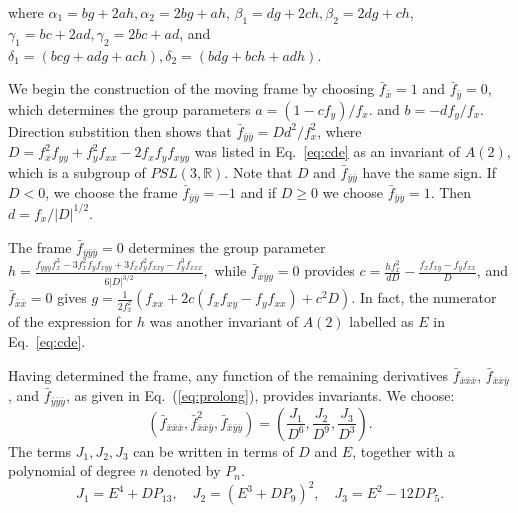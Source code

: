 \documentclass{artjlt}
\def\R{\mathbb{R}}
\begin{document}
\noindent where $\alpha_1 = b g + 2 a h, \alpha_2 = 2 b g + a h$, $\beta_1 = d g + 2 c h, \beta_2 = 2 d g + c h$, $\gamma_1 = b c + 2 a d, \gamma_2= 2 b c + a d$, and $\delta_1 = (b c g+a d g+a c h), \delta_2 = (b d g+b c h+a d h)$.

We begin the construction of the moving frame by choosing $\bar f_{\bar x}
= 1$ and $\bar f_{\bar y}=  0$, which determines the group parameters $a =
(1-c f_y)/f_x.$ and $b = -d f_y/f_x$. Direction substition then shows that
$\bar f_{\bar y \bar y} = D d^2 / f_x^2$, where $D = f_{x}^2 f_{yy} + f_y^2
f_{xx} - 2 f_x f_y f_{xyy}$ was listed in Eq.~\eqref{eq:cde} as an invariant of
$A(2)$, which is a subgroup of $PSL(3,\R)$. Note that $D$ and
$\bar f_{\bar y \bar y}$ have the same sign. If $D < 0$, we choose the
frame $\bar{f}_{\bar y \bar y} = -1$ and if $D \ge 0$ we choose $\bar
f_{\bar y \bar y} = 1$. Then $d = f_x/|D|^{1/2}.$

The frame $\bar f_{ \bar y \bar y \bar y} = 0$ determines the group
parameter $ h = \frac{f_{yyy}f_x^3 - 3 f_x^2 f_y f_{xyy} + 3 f_x f_y^2
f_{xxy} - f_y^3 f_{xxx}}{6|D|^{3/2}},$ while $\bar f_{ \bar x \bar y 
y}=0$ provides $ c = \frac{h f_x^2}{d D} - \frac{f_x f_{xy} - f_y
f_{xx}}{D}$, and $\bar f_{ \bar x \bar x}=0$ gives $ g = \frac{1}{2
f_x^2}(f_{xx} + 2 c ( f_x f_{xy} - f_y f_{xx} ) + c^2 D).$ In fact, the
numerator of the expression for $h$ was another invariant of $A(2)$ labelled as
$E$ in Eq.~\eqref{eq:cde}.


Having determined the frame, any function of the remaining derivatives $\bar f_{ \bar x \bar x \bar x}$, $\bar f_{ \bar x \bar x \bar y}$, and $\bar f_{ \bar y \bar y \bar y}$, as given in Eq.~(\ref{eq:prolong}), provides invariants. We choose: 
\begin{equation*}
 (\bar f_{\bar x\bar x\bar x}, \bar f_{\bar x\bar x\bar y}^2, \bar f_{\bar
 x\bar y\bar
 y})=\left(\frac{J_1}{D^6},\frac{J_2}{D^9},\frac{J_3}{D^3}\right).
\end{equation*} 
The terms $J_1, J_2, J_3$ can be written in terms of $D$ and $E$, together
with a polynomial of degree $n$ denoted by $P_n$. 
\begin{equation*}
    J_1 = E^4 + D P_{13},\quad J_2 = (E^3 + D P_9)^2,\quad J_3=E^2 -12 D P_5.
\end{equation*}
\end{document}

